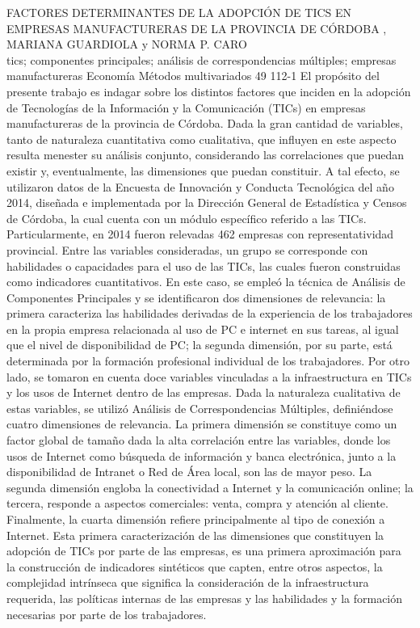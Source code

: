 \A
{FACTORES DETERMINANTES DE LA ADOPCIÓN DE TICS EN EMPRESAS MANUFACTURERAS DE LA PROVINCIA DE CÓRDOBA}
{, MARIANA GUARDIOLA y NORMA P. CARO}
{
\\}
{tics; componentes principales; análisis de correspondencias múltiples; empresas manufactureras} 
 {Economía} 
 {Métodos multivariados} 
 {49} 
 {112-1}
{El propósito del presente trabajo es indagar sobre los distintos factores que inciden en la adopción de Tecnologías de la Información y la Comunicación (TICs) en empresas manufactureras de la provincia de Córdoba. Dada la gran cantidad de variables, tanto de naturaleza cuantitativa como cualitativa, que influyen en este aspecto resulta menester su análisis conjunto, considerando las correlaciones que puedan existir y, eventualmente, las dimensiones que puedan constituir. A tal efecto, se utilizaron datos de la Encuesta de Innovación y Conducta Tecnológica del año 2014, diseñada e implementada por la Dirección General de Estadística y Censos de Córdoba, la cual cuenta con un módulo específico referido a las TICs. Particularmente, en 2014 fueron relevadas 462 empresas con representatividad provincial. Entre las variables consideradas, un grupo se corresponde con habilidades o capacidades para el uso de las TICs, las cuales fueron construidas como indicadores cuantitativos. En este caso, se empleó la técnica de Análisis de Componentes Principales y se identificaron dos dimensiones de relevancia: la primera caracteriza las habilidades derivadas de la experiencia de los trabajadores en la propia empresa relacionada al uso de PC e internet en sus tareas, al igual que el nivel de disponibilidad de PC; la segunda dimensión, por su parte, está determinada por la formación profesional individual de los trabajadores. Por otro lado, se tomaron en cuenta doce variables vinculadas a la infraestructura en TICs y los usos de Internet dentro de las empresas. Dada la naturaleza cualitativa de estas variables, se utilizó Análisis de Correspondencias Múltiples, definiéndose cuatro dimensiones de relevancia. La primera dimensión se constituye como un factor global de tamaño dada la alta correlación entre las variables, donde los usos de Internet como búsqueda de información y banca electrónica, junto a la disponibilidad de Intranet o Red de Área local, son las de mayor peso. La segunda dimensión engloba la conectividad a Internet y la comunicación online; la tercera, responde a aspectos comerciales: venta, compra y atención al cliente. Finalmente, la cuarta dimensión refiere principalmente al tipo de conexión a Internet.  Esta primera caracterización de las dimensiones que constituyen la adopción de TICs por parte de las empresas, es una primera aproximación para la construcción de indicadores sintéticos que capten, entre otros aspectos, la complejidad intrínseca que significa la consideración de la infraestructura requerida, las políticas internas de las empresas y las habilidades y la formación necesarias por parte de los trabajadores.}
